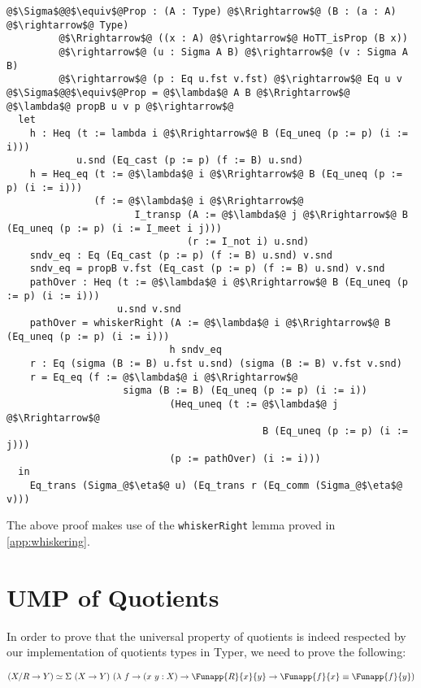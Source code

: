 \documentclass[12pt,twoside,maitrise]{dms}
\theoremstyle{definition}
\numberwithin{equation}{section}
\numberwithin{table}{chapter}
\numberwithin{figure}{chapter}
\newcommand\id[1] {\texttt{#1}}
\begin{document}
\begin{verbatim}
@$\Sigma$@@$\equiv$@Prop : (A : Type) @$\Rrightarrow$@ (B : (a : A) @$\rightarrow$@ Type)
         @$\Rrightarrow$@ ((x : A) @$\rightarrow$@ HoTT_isProp (B x))
         @$\rightarrow$@ (u : Sigma A B) @$\rightarrow$@ (v : Sigma A B)
         @$\rightarrow$@ (p : Eq u.fst v.fst) @$\rightarrow$@ Eq u v
@$\Sigma$@@$\equiv$@Prop = @$\lambda$@ A B @$\Rrightarrow$@ @$\lambda$@ propB u v p @$\rightarrow$@
  let
    h : Heq (t := lambda i @$\Rrightarrow$@ B (Eq_uneq (p := p) (i := i)))
            u.snd (Eq_cast (p := p) (f := B) u.snd)
    h = Heq_eq (t := @$\lambda$@ i @$\Rrightarrow$@ B (Eq_uneq (p := p) (i := i)))
               (f := @$\lambda$@ i @$\Rrightarrow$@
                      I_transp (A := @$\lambda$@ j @$\Rrightarrow$@ B (Eq_uneq (p := p) (i := I_meet i j)))
                               (r := I_not i) u.snd)
    sndv_eq : Eq (Eq_cast (p := p) (f := B) u.snd) v.snd
    sndv_eq = propB v.fst (Eq_cast (p := p) (f := B) u.snd) v.snd
    pathOver : Heq (t := @$\lambda$@ i @$\Rrightarrow$@ B (Eq_uneq (p := p) (i := i)))
                   u.snd v.snd
    pathOver = whiskerRight (A := @$\lambda$@ i @$\Rrightarrow$@ B (Eq_uneq (p := p) (i := i)))
                            h sndv_eq
    r : Eq (sigma (B := B) u.fst u.snd) (sigma (B := B) v.fst v.snd)
    r = Eq_eq (f := @$\lambda$@ i @$\Rrightarrow$@
                    sigma (B := B) (Eq_uneq (p := p) (i := i))
                            (Heq_uneq (t := @$\lambda$@ j @$\Rrightarrow$@
                                            B (Eq_uneq (p := p) (i := j)))
                            (p := pathOver) (i := i)))
  in
    Eq_trans (Sigma_@$\eta$@ u) (Eq_trans r (Eq_comm (Sigma_@$\eta$@ v)))
\end{verbatim}

The above proof makes use of the \id{whiskerRight} lemma proved in
\autoref{app:whiskering}.

\section{UMP of Quotients}\label{app:ump-quot}

In order to prove that the universal property of quotients is indeed respected by our
implementation of quotients types in Typer, we need to prove the following:

\begin{align*}
  & (X/R \rightarrow Y) \simeq \Sigma \ (X \rightarrow Y) \ (\lambda \ f \rightarrow (x \ y : X) \rightarrow \Funapp{R}{x}{y} \rightarrow \Funapp{f}{x} \equiv \Funapp{f}{y}) \\
\end{align*}
\end{document}
